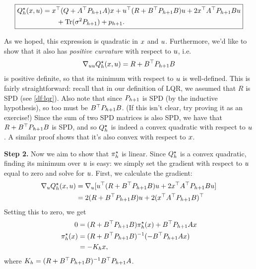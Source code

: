 \documentclass[../main/main]{subfiles}
\begin{document}
\begin{equation}
    \boxed{
        \begin{aligned}
            Q^\star_h(x, u) &= x^\top (Q + A^\top P_{h+1} A) x + u^\top (R + B^\top P_{h+1} B) u
            + 2x^\top A^\top P_{h+1} B u \\
            &\qquad + \operatorname*{\textrm{Tr}}(\sigma^2 P_{h+1}) + p_{h+1}.
        \end{aligned}
    }
    \label{eq:q_star_lqr}
\end{equation}

As we hoped, this expression is quadratic in $x$ and $u$.
Furthermore, we'd like to show that it also has \emph{positive curvature} with respect to $u$, i.e. \[ \nabla_{u u} Q_h^\star(x, u) = R + B^\top P_{h+1} B \] is positive definite, so that its minimum with respect to $u$ is well-defined.
This is fairly straightforward:
recall that in our definition of LQR,
we assumed that $R$ is SPD (see \autoref{df:lqr}).
Also note that since $P_{h+1}$ is SPD (by the inductive hypothesis), so too must be $B^\top P_{h+1} B$. (If this isn't clear, try proving it as an exercise!)
Since the sum of two SPD matrices is also SPD, we have that $R + B^\top P_{h+1} B$ is SPD,
and so $Q^\star_h$ is indeed a convex quadratic with respect to $u$. A similar proof shows that it's also convex with respect to $x$.

\textbf{Step 2.} Now we aim to show that $\pi^\star_h$ is linear.
Since $Q^\star_h$ is a convex quadratic, finding its minimum over $u$ is easy:
we simply set the gradient with respect to $u$ equal to zero and solve for $u$.
First, we calculate the gradient:
\begin{align*}
    \nabla_u Q^\star_h(x, u) &= \nabla_u [ u^\top (R + B^\top P_{h+1} B) u + 2 x^\top A^\top P_{h+1} B u ] \\
    &= 2 (R + B^\top P_{h+1} B) u + 2 (x^\top A^\top P_{h+1} B)^\top
\end{align*}
Setting this to zero, we get \begin{align}
    0 &= (R + B^\top P_{h+1} B) \pi^\star_h(x) + B^\top P_{h+1} A x \nonumber \\
    \pi^\star_h(x) &= (R + B^\top P_{h+1} B)^{-1} (-B^\top P_{h+1} A x) \nonumber \\
    &= - K_h x,
\end{align}
where $K_h = (R + B^\top P_{h+1} B)^{-1} B^\top P_{h+1} A$.
\end{document}
